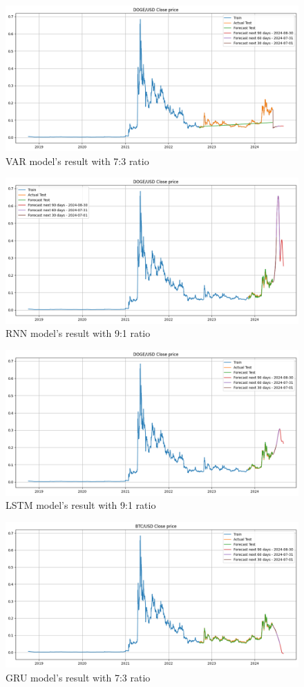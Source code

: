 \documentclass{ieeeojies}
\begin{document}
\begin{figure}[H]
    \centering 
    \includegraphics[width=0.8\linewidth]{./././visualize/VAR/DOGE-70-30.png} 
    \caption{VAR model’s result with 7:3 ratio}
    \label{fig:31}
\end{figure}
\begin{figure}[H]
    \centering 
    \includegraphics[width=0.8\linewidth]{./././visualize/RNN/DOGE-90-10.png} 
    \caption{RNN model’s result with 9:1 ratio}
    \label{fig:32}
\end{figure}
\begin{figure}[H]
    \centering 
    \includegraphics[width=0.8\linewidth]{./././visualize/LSTM/DOGE-90-10.png} 
    \caption{LSTM model’s result with 9:1 ratio}
    \label{fig:33}
\end{figure}
\begin{figure}[H]
    \centering 
    \includegraphics[width=0.8\linewidth]{./././visualize/GRU/DOGE-70-30.png} 
    \caption{GRU model’s result with 7:3 ratio}
    \label{fig:34}
\end{figure}
\end{document}
